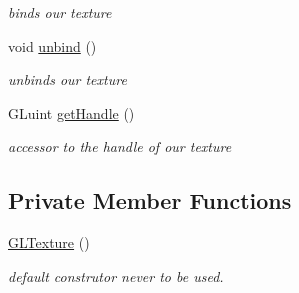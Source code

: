 \begin{DoxyCompactItemize}
\begin{DoxyCompactList}\small\item\em binds our texture \end{DoxyCompactList}\item 
\hypertarget{class_g_l_texture_a96090b31b8d550a50eb1d4bed1055774}{void \hyperlink{class_g_l_texture_a96090b31b8d550a50eb1d4bed1055774}{unbind} ()}\label{class_g_l_texture_a96090b31b8d550a50eb1d4bed1055774}

\begin{DoxyCompactList}\small\item\em unbinds our texture \end{DoxyCompactList}\item 
\hypertarget{class_g_l_texture_a0232aa38a299d2570a06367cd8ebd688}{G\-Luint \hyperlink{class_g_l_texture_a0232aa38a299d2570a06367cd8ebd688}{get\-Handle} ()}\label{class_g_l_texture_a0232aa38a299d2570a06367cd8ebd688}

\begin{DoxyCompactList}\small\item\em accessor to the handle of our texture \end{DoxyCompactList}\end{DoxyCompactItemize}
\subsection*{Private Member Functions}
\begin{DoxyCompactItemize}
\item 
\hypertarget{class_g_l_texture_abb3da94e96ea6893e33e51c5422a42f9}{\hyperlink{class_g_l_texture_abb3da94e96ea6893e33e51c5422a42f9}{G\-L\-Texture} ()}\label{class_g_l_texture_abb3da94e96ea6893e33e51c5422a42f9}

\begin{DoxyCompactList}\small\item\em default construtor never to be used. \end{DoxyCompactList}\end{DoxyCompactItemize}
